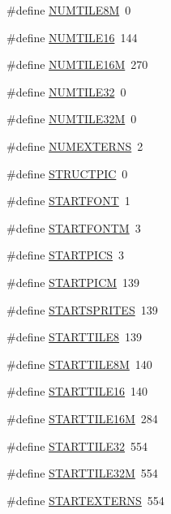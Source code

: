 \begin{DoxyCompactItemize}
\#define \hyperlink{GFXV__WL1_8H_a99d75e9d203bae79464f2ecd3fd31b8d}{NUMTILE8M}~0
\item 
\#define \hyperlink{GFXV__WL1_8H_a64d23288f15517babe845b31bebdf108}{NUMTILE16}~144
\item 
\#define \hyperlink{GFXV__WL1_8H_a80bd5aa78c52471ba88d9d15baeb5e44}{NUMTILE16M}~270
\item 
\#define \hyperlink{GFXV__WL1_8H_a63d2fe64d989433ecd39d601070bfe04}{NUMTILE32}~0
\item 
\#define \hyperlink{GFXV__WL1_8H_ac85fdf79a513ee60e10cbb347ba5129f}{NUMTILE32M}~0
\item 
\#define \hyperlink{GFXV__WL1_8H_abb86554baf24d8863e54bf20d68120b5}{NUMEXTERNS}~2
\item 
\#define \hyperlink{GFXV__WL1_8H_aa325a0ff072fddd0404951d4f486fcaa}{STRUCTPIC}~0
\item 
\#define \hyperlink{GFXV__WL1_8H_a91e546d8307de206a3822f7ea9064cb2}{STARTFONT}~1
\item 
\#define \hyperlink{GFXV__WL1_8H_a8e97342cc14d7aed1d20b6ff859f22ef}{STARTFONTM}~3
\item 
\#define \hyperlink{GFXV__WL1_8H_aaf17bc60cff0a0236cafed9026641531}{STARTPICS}~3
\item 
\#define \hyperlink{GFXV__WL1_8H_abd418cd2e72de01524b8400b58ad8273}{STARTPICM}~139
\item 
\#define \hyperlink{GFXV__WL1_8H_a08f15ca2b66024c7df43a601df18e33a}{STARTSPRITES}~139
\item 
\#define \hyperlink{GFXV__WL1_8H_a63a36c8955b74ee16ba0fc61f4d62478}{STARTTILE8}~139
\item 
\#define \hyperlink{GFXV__WL1_8H_a56df7bfae7e081f1fe22c67f356c0f12}{STARTTILE8M}~140
\item 
\#define \hyperlink{GFXV__WL1_8H_adde5c841b7c315dca1c114be851a14bf}{STARTTILE16}~140
\item 
\#define \hyperlink{GFXV__WL1_8H_a8158cbe2ebd8e9f311fd7637be063176}{STARTTILE16M}~284
\item 
\#define \hyperlink{GFXV__WL1_8H_afdb080cedc6a487f761df7481033e345}{STARTTILE32}~554
\item 
\#define \hyperlink{GFXV__WL1_8H_a04e773bd033b5375cb82a2bc5142eb3a}{STARTTILE32M}~554
\item 
\#define \hyperlink{GFXV__WL1_8H_a4bab9c7dbc3408ece8bf42a298f4a0ad}{STARTEXTERNS}~554
\end{DoxyCompactItemize}
